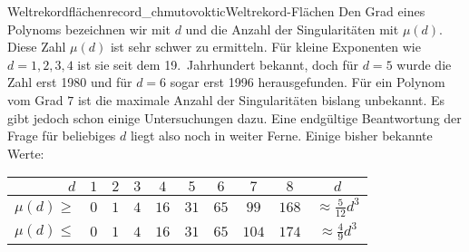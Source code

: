 \begin{surferIntroPage}{Weltrekordflächen}{record_chmutovoktic}{Weltrekord-Flächen}
    Den Grad eines Polynoms bezeichnen wir mit $d$ und die Anzahl der Singularitäten mit $\mu(d)$. Diese Zahl $\mu(d)$ ist sehr schwer zu ermitteln. Für kleine Exponenten wie $d=1,2,3,4$ ist sie seit dem 19.\ Jahrhundert bekannt, doch für
    $d=5$ wurde die Zahl erst 1980 und für $d=6$ sogar erst 1996 herausgefunden.
    Für ein Polynom vom Grad $7$ ist die maximale Anzahl der Singularitäten bislang unbekannt. Es gibt jedoch schon einige Untersuchungen dazu.
    Eine endgültige Beantwortung der Frage für beliebiges $d$  liegt also noch in weiter Ferne.
    Einige bisher bekannte Werte:
    \begin{center}
      \begin{tabular}{r|cccccccc|c}
        $d$ & $1$ & $2$ & $3$ & $4$ & $5$ & $6$ & $7$ & $8$ & $d$\\
        \hline
        \hline
        \rule{0pt}{1.2em}$\mu(d)\ge$ & $0$ & $1$ & $4$ & $16$ & $31$ & $65$ &
        $99$ & $168$ & 
        $\approx \frac{5}{12}d^3$\\[0.3em]
        \hline
        \rule{0pt}{1.2em}$\mu(d)\le$ & $0$ & $1$ & $4$ & $16$ & $31$ & $65$ &
        $104$ & $174$ & $\approx \frac{4}{9}d^3$
      \end{tabular}
    \end{center}
\end{surferIntroPage}
